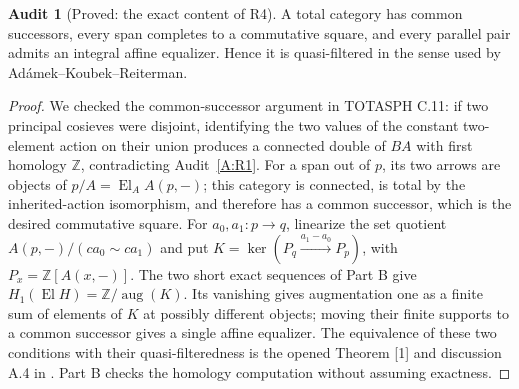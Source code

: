 \documentclass[11pt,a4paper]{article}
\newcommand{\Z}{\mathbb Z}
\newcommand{\El}{\operatorname{El}}
\newcommand{\aug}{\operatorname{aug}}
\theoremstyle{definition}
\newtheorem{audit}[theorem]{Audit}
\begin{document}
\begin{audit}[Proved: the exact content of R4]\label{A:R4}
A total category has common successors, every span completes to a commutative square, and every parallel pair admits an integral affine equalizer. Hence it is quasi-filtered in the sense used by Ad\'amek--Koubek--Reiterman.
\end{audit}
\begin{proof}
We checked the common-successor argument in TOTASPH C.11: if two principal cosieves were disjoint, identifying the two values of the constant two-element action on their union produces a connected double of $BA$ with first homology $\Z$, contradicting Audit~\ref{A:R1}. For a span out of $p$, its two arrows are objects of $p/A=\El_AA(p,-)$; this category is connected, is total by the inherited-action isomorphism, and therefore has a common successor, which is the desired commutative square. For $a_0,a_1:p\to q$, linearize the set quotient $A(p,-)/(ca_0\sim ca_1)$ and put $K=\ker(P_q\xrightarrow{a_1-a_0}P_p)$, with $P_x=\Z[A(x,-)]$. The two short exact sequences of Part B give $H_1(\El H)=\Z/\aug(K)$. Its vanishing gives augmentation one as a finite sum of elements of $K$ at possibly different objects; moving their finite supports to a common successor gives a single affine equalizer. The equivalence of these two conditions with their quasi-filteredness is the opened Theorem [1] and discussion A.4 in \citet[pp.~369--370]{AdamekKoubekReiterman1981}. Part B checks the homology computation without assuming exactness.
\end{proof}
\end{document}
